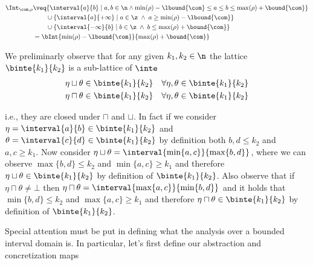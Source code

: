 \begin{align*}
  \Int_{\com,\rho} & \veq \{ \interval{a}{b} \mid a, b \in \n \land
                     \min(\rho) - \lbound{\com} \leq a \leq b \leq \max(\rho) + \bound{\com}\} \\
                   & \phantom{\veq} \cup \{\interval{a}{+\infty} \mid a \in\z \; \land \; a \geq \min(\rho) - \lbound{\com}\} \\
                   & \phantom{\veq} \cup \{\interval{-\infty}{b} \mid b \in\z \; \land \; b \leq \max(\rho) + \bound{\com}\} \\
                   & = \bInt{\min(\rho)-\lbound{\com}}{\max(\rho) + \bound{\com}}
\end{align*}

We preliminarly observe that for any given \(k_1,k_2\in\n\) the
lattice \(\binte{k_1}{k_2}\) is a sub-lattice of \(\inte\)
\begin{align*}
  \eta \sqcup \theta & \in \binte{k_1}{k_2} & \forall \eta,\theta \in \binte{k_1}{k_2} \\
  \eta \sqcap \theta & \in \binte{k_1}{k_2} & \forall \eta,\theta \in \binte{k_1}{k_2}
\end{align*}

i.e., they are closed under \(\sqcap\) and \(\sqcup\). In fact if we
consider \({\eta = \interval{a}{b} \in \binte{k_1}{k_2}}\) and
\({\theta = \interval{c}{d} \in \binte{k_1}{k_2}}\) by definition both
\(b,d \leq k_2\) and \(a,c \geq k_1\). Now consider
\({\eta \sqcup \theta = \interval{\min\{a,c\}}{\max\{b,d\}}}\), where
we can observe \(\max\{b,d\} \leq k_2\) and \(\min\{a,c\} \geq k_1\)
and therefore \({\eta \sqcup \theta \in \binte{k_1}{k_2}}\) by
definition of \(\binte{k_1}{k_2}\).  Also observe that if
\(\eta \sqcap \theta \neq \bot\) then
\({\eta \sqcap \theta = \interval{\max\{a,c\}}{\min\{b,d\}}}\) and it
holds that \({\min\{b,d\} \leq k_2}\) and \({\max\{a,c\} \geq k_1}\)
and therefore \({\eta \sqcap \theta \in \binte{k_1}{k_2}}\) by definition of
\(\binte{k_1}{k_2}\).

\medskip

\noindent
Special attention must be put in defining what the analysis over a
bounded interval domain is. In particular, let's first define our
abstraction and concretization maps

